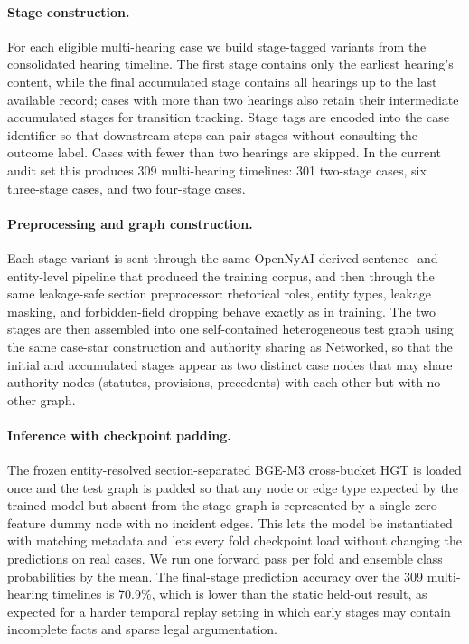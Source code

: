 \documentclass[runningheads]{llncs}
\begin{document}
\paragraph{Stage construction.}
For each eligible multi-hearing case we build stage-tagged variants from the consolidated hearing timeline. The first stage contains only the earliest hearing's content, while the final accumulated stage contains all hearings up to the last available record; cases with more than two hearings also retain their intermediate accumulated stages for transition tracking. Stage tags are encoded into the case identifier so that downstream steps can pair stages without consulting the outcome label. Cases with fewer than two hearings are skipped. In the current audit set this produces 309 multi-hearing timelines: 301 two-stage cases, six three-stage cases, and two four-stage cases.

\paragraph{Preprocessing and graph construction.}
Each stage variant is sent through the same OpenNyAI-derived sentence- and entity-level pipeline that produced the training corpus, and then through the same leakage-safe section preprocessor: rhetorical roles, entity types, leakage masking, and forbidden-field dropping behave exactly as in training. The two stages are then assembled into one self-contained heterogeneous test graph using the same case-star construction and authority sharing as Networked, so that the initial and accumulated stages appear as two distinct case nodes that may share authority nodes (statutes, provisions, precedents) with each other but with no other graph.

\paragraph{Inference with checkpoint padding.}
The frozen entity-resolved section-separated BGE-M3 cross-bucket HGT is loaded once and the test graph is padded so that any node or edge type expected by the trained model but absent from the stage graph is represented by a single zero-feature dummy node with no incident edges. This lets the model be instantiated with matching metadata and lets every fold checkpoint load without changing the predictions on real cases. We run one forward pass per fold and ensemble class probabilities by the mean. The final-stage prediction accuracy over the 309 multi-hearing timelines is 70.9\%, which is lower than the static held-out result, as expected for a harder temporal replay setting in which early stages may contain incomplete facts and sparse legal argumentation.
\end{document}
